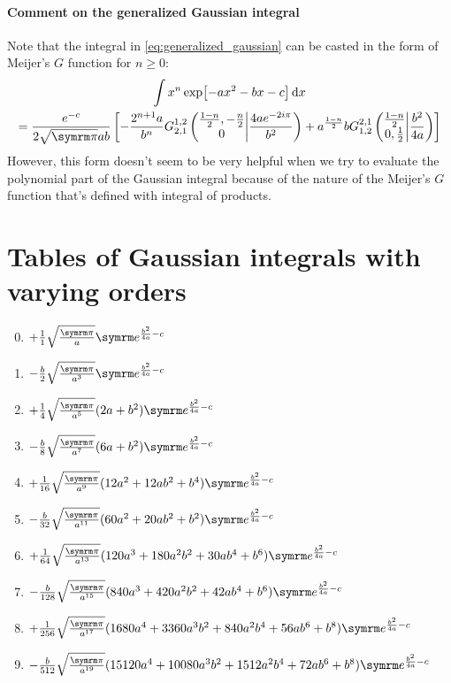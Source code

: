 \paragraph{Comment on the generalized Gaussian integral} Note that the integral in \cref{eq:generalized_gaussian} can be casted in the form of Meijer's $G$ function for $n \geq 0$:
\begin{multline}
    \int x^n\exp[-ax^2 - bx - c]\dd{x} \\= \frac{e^{-c}}{2\sqrt{\cpi}ab}\left[- \frac{2^{n + 1}a}{b^n} {G_{2, 1}^{1, 2}\left(\begin{matrix} \frac{1 - n}{2}, - \frac{n}{2}  \\0 \end{matrix} \middle| {\frac{4 a e^{- 2 i \pi}}{b^{2}}} \right)} + a^{\frac{1 - n}{2}}b {G_{1, 2}^{2, 1}\left(\begin{matrix} \frac{1 - n}{2}\\0, \frac{1}{2}\end{matrix} \middle| {\frac{b^{2}}{4 a}} \right)}\right]
\end{multline}
However, this form doesn't seem to be very helpful when we try to evaluate the polynomial part of the Gaussian integral because of the nature of the Meijer's $G$ function that's defined with integral of products.

\section{Tables of Gaussian integrals with varying orders}
\label{sec:table_of_gaussian_integrals}

\everymath{\displaystyle}
\begin{enumerate}[label = {$n = \arabic*$:}]
    \setcounter{enumi}{-1}
    \item $+\frac{1}{1}\sqrt{\frac{\cpi}{a}}\e^{\frac{b^2}{4a} - c}$
    \item $-\frac{b}{2}\sqrt{\frac{\cpi}{a^3}} \e^{\frac{b^2}{4a} - c}$
    \item $+\frac{1}{4}\sqrt{\frac{\cpi}{a^5}} (2a + b^2) \e^{\frac{b^2}{4a} - c}$
    \item $-\frac{b}{8}\sqrt{\frac{\cpi}{a^7}} (6a + b^2) \e^{\frac{b^2}{4a} - c}$
    \item $+\frac{1}{16}\sqrt{\frac{\cpi}{a^9}} (12a^2 + 12ab^2 + b^4)\e^{\frac{b^2}{4a} - c}$
    \item $-\frac{b}{32}\sqrt{\frac{\cpi}{a^{11}}} (60a^2 + 20ab^2 + b^2)\e^{\frac{b^2}{4a} - c}$
    \item $+\frac{1}{64}\sqrt{\frac{\cpi}{a^{13}}} (120a^3 + 180a^2b^2 + 30ab^4 + b^6)\e^{\frac{b^2}{4a} - c}$
    \item $-\frac{b}{128}\sqrt{\frac{\cpi}{a^{15}}} (840a^3 + 420a^2b^2 + 42ab^4 + b^6)\e^{\frac{b^2}{4a} - c}$
    \item $+\frac{1}{256}\sqrt{\frac{\cpi}{a^{17}}} (1680a^4 + 3360a^3b^2 + 840a^2b^4 + 56ab^6 + b^8)\e^{\frac{b^2}{4a} - c}$
    \item $-\frac{b}{512}\sqrt{\frac{\cpi}{a^{19}}} (15120a^4 + 10080a^3b^2 + 1512a^2b^4 + 72ab^6 + b^8)\e^{\frac{b^2}{4a} - c}$
\end{enumerate}
